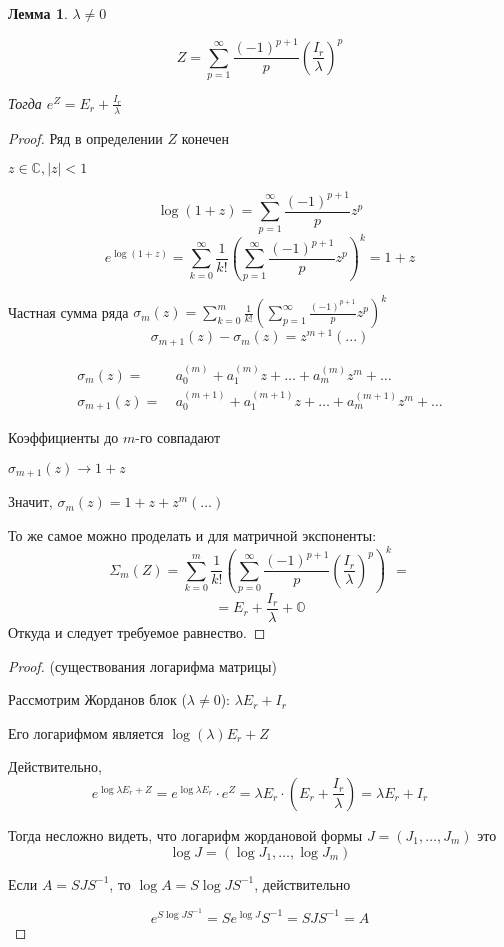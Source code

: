 \documentclass[a4paper]{article}
\theoremstyle{indented}
\newtheorem*{lemma}{Лемма}
\theoremstyle{definition}
\theoremstyle{remark}
\begin{document}
\begin{lemma}
  $\lambda \neq 0$

  $$Z = \sum_{p = 1}^{\infty}\frac{(-1)^{p+1}}{p} \left(\frac{I_r}{\lambda}\right)^p$$

  Тогда $e^Z = E_r + \frac{I_r}{\lambda}$
\end{lemma}
\begin{proof}
  Ряд в определении $Z$ конечен

  $z \in \mathbb{C}, |z| < 1$

  \[\log(1+z) = \sum_{p=1}^{\infty} \frac{(-1)^{p+1}}{p}z^p\]
  \[e^{\log (1+z)} = \sum_{k = 0}^{\infty}\frac{1}{k!} \left(\sum_{p = 1}^{\infty}\frac{(-1)^{p+1}}{p}z^p\right)^k = 1+z\] 

  Частная сумма ряда $\sigma_m(z) = \sum_{k = 0}^{m}\frac{1}{k!} (\sum_{p = 1}^{\infty}\frac{(-1)^{p+1}}{p}z^p)^k$
  \[\sigma_{m+1}(z) - \sigma_m(z) = z^{m+1}(...)\]

  \begin{equation*}
    \begin{aligned}
        \sigma_m(z) = & \ a_0^{(m)} + a_1^{(m)}z + \ldots + a_m^{(m)} z^m + \ldots \\
        \sigma_{m+1}(z) = &  \ a_0^{(m+1)} + a_1^{(m+1)}z + \ldots + a_m^{(m+1)} z^m + \ldots 
    \end{aligned}
  \end{equation*}

  Коэффициенты до $m$-го совпадают

  $\sigma_{m+1}(z) \to 1 + z$

  Значит, $\sigma_m(z) = 1 + z + z^m(\ldots)$

  То же самое можно проделать и для матричной экспоненты:
  \[\Sigma_m(Z) = \sum_{k = 0}^{m}\frac{1}{k!} \left(\sum_{p = 0}^{\infty}\frac{(-1)^{p+1}}{p} \left(\frac{I_r}{\lambda} \right)^p\right)^k = \]
  \[= E_r + \frac{I_r}{\lambda} + \mathbb{O}\]
  Откуда и следует требуемое равнество.

\end{proof}

\begin{proof} (существования логарифма матрицы)

  Рассмотрим Жорданов блок ($\lambda \neq 0$): $\lambda E_r + I_r$

  Его логарифмом является $\log (\lambda) E_r + Z$

  Действительно,
  \[e^{\log \lambda E_r + Z} = e^{\log \lambda E_r} \cdot e^{Z} = \lambda E_r \cdot (E_r + \frac{I_r}{\lambda}) = \lambda E_r + I_r\]

  Тогда несложно видеть, что логарифм жордановой формы $J = (J_1,\ldots, J_m)$ это \[\log J = (\log J_1, \ldots, \log J_m)\]

  Если $A = SJS^{-1}$, то $\log A = S \log J S^{-1}$, действительно

  \[e^{S \log J S^{-1}} = Se^{\log J} S^{-1} = S J S^{-1} = A\]
\end{proof}
\end{document}
